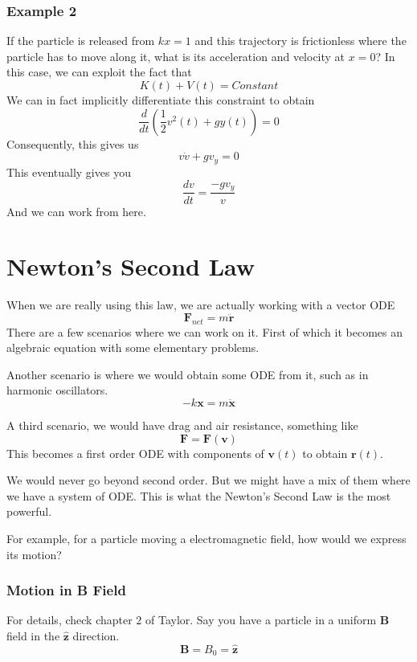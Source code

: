 \documentclass[12pt]{article}
\newcommand{\dydx}[2]{\frac{d #1}{d #2}}
\newcommand{\paren}[1]{\left( #1 \right)}
\newcommand{\unz}{\hat{\mathbf{z}}}
\begin{document}
    \subsubsection{Example 2}
    If the particle is released from $kx=1$ and this trajectory is frictionless where the particle has to move along it, what is its acceleration and velocity at $x=0$? In this case, we can exploit the fact that
    \[
    K(t) + V(t) = \textit{Constant}
    \]
    We can in fact implicitly differentiate this constraint to obtain
    \[
    \dydx{}{t}\paren{ \frac{1}{2}v^2(t) + gy(t)} = 0
    \]
    Consequently, this gives us
    \[
    v\dot{v} + gv_y = 0
    \]
    This eventually gives you
    \[
    \dydx{v}{t} = \frac{-g v_y}{v}
    \]
    And we can work from here.



\section{Newton's Second Law}
    When we are really using this law, we are actually working with a vector ODE
    \[
    \mathbf{F}_{net} = m\ddot{\mathbf{r}}
    \]
    There are a few scenarios where we can work on it. First of which it becomes an algebraic equation with some elementary problems.

    Another scenario is where we would obtain some ODE from it, such as in harmonic oscillators. 
        \[
        -k\mathbf{x} = m\ddot{\mathbf{x}}
        \]

    A third scenario, we would have drag and air resistance, something like
    \[
    \mathbf{F} = \mathbf{F}(\mathbf{v})
    \]
    This becomes a first order ODE with components of $\mathbf{v}(t)$ to obtain $\mathbf{r}(t)$.

    We would never go beyond second order. But we might have a mix of them where we have a system of ODE. This is what the Newton's Second Law is the most powerful. 

    For example, for a particle moving a electromagnetic field, how would we express its motion?

\subsubsection{Motion in B Field}
    For details, check chapter $2$ of Taylor. Say you have a particle in a uniform \textbf{B} field in the $\unz$ direction. 
    \[
    \mathbf{B} = B_0 = \unz
    \]
\end{document}

